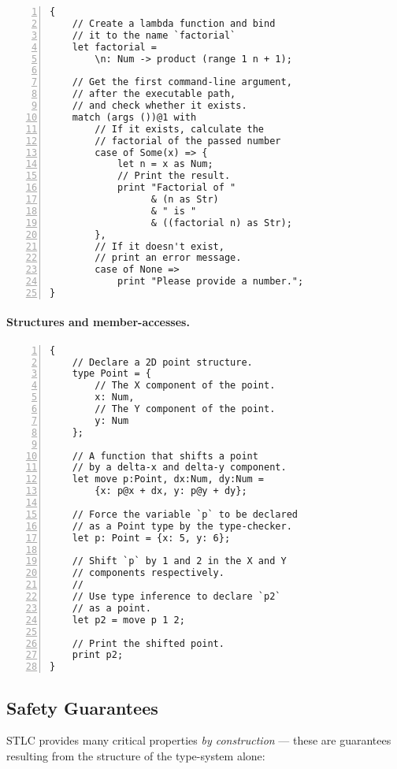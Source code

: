 \documentclass[conference]{IEEEtran}
\begin{document}
\begin{lstlisting}[language=Verus, caption={Total factorial using range/product combinators}, numbers=left]
{
    // Create a lambda function and bind
    // it to the name `factorial`
    let factorial =
        \n: Num -> product (range 1 n + 1);

    // Get the first command-line argument,
    // after the executable path,
    // and check whether it exists.
    match (args ())@1 with
        // If it exists, calculate the
        // factorial of the passed number
        case of Some(x) => {
            let n = x as Num;
            // Print the result.
            print "Factorial of "
                  & (n as Str)
                  & " is "
                  & ((factorial n) as Str);
        },
        // If it doesn't exist,
        // print an error message.
        case of None =>
            print "Please provide a number.";
}
\end{lstlisting}

\paragraph{Structures and member-accesses.}
\begin{lstlisting}[language=Verus, caption={Point structure and manipulation with functions.}, numbers=left]
{
    // Declare a 2D point structure.
    type Point = {
        // The X component of the point.
        x: Num,
        // The Y component of the point.
        y: Num
    };

    // A function that shifts a point
    // by a delta-x and delta-y component.
    let move p:Point, dx:Num, dy:Num =
        {x: p@x + dx, y: p@y + dy};
        
    // Force the variable `p` to be declared
    // as a Point type by the type-checker.
    let p: Point = {x: 5, y: 6};

    // Shift `p` by 1 and 2 in the X and Y
    // components respectively.
    // 
    // Use type inference to declare `p2`
    // as a point.
    let p2 = move p 1 2;

    // Print the shifted point.
    print p2;
}   
\end{lstlisting}

\subsection{Safety Guarantees}
STLC provides many critical properties \emph{by construction} --- these are guarantees resulting from the structure of the type-system alone:
\end{document}
